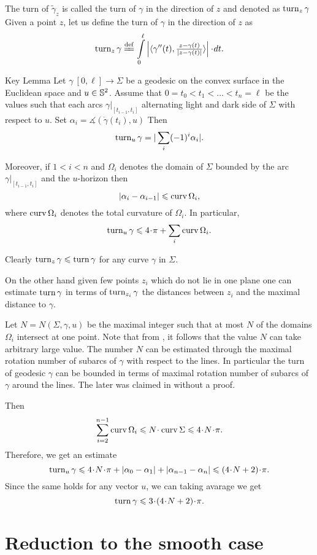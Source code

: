 \documentclass[a4paper,10pt]{amsart}
\begin{document}
The turn of $\tilde\gamma_z$ is called the turn of $\gamma$ in the direction of $z$ and denoted as $\mathop{\rm turn}\nolimits_z\gamma$
Given a point $z$, let us define the turn of $\gamma$ in the direction of $z$ as
\[\turn_z\gamma
\df
\int\limits_0^\ell
\left|
\langle\gamma''(t),\tfrac{z-\gamma(t)}{|z-\gamma(t)|}\rangle
\right|
\cdot dt.\]

\begin{thm}{Key Lemma}
\label{lem:key}
Let $\gamma\:[0,\ell]\to \Sigma$ be a geodesic on the convex surface in the Euclidean space 
and $u\in\mathbb{S}^2$.
Assume that $0=t_0<t_1<\dots<t_n=\ell$ be the values such that each arcs $\gamma|_{[t_{i-1},t_i]}$ alternating light and dark side of $\Sigma$ with respect to $u$.
Set $\alpha_i=\measuredangle(\dot\gamma(t_i),u)$
Then 
\[\mathop{\rm turn}\nolimits_u\gamma=|\sum_i(-1)^i\alpha_i|.\]

Moreover, if $1<i<n$ 
and $\Omega_i$ denotes the domain of $\Sigma$ bounded by the arc $\gamma|_{[t_{i-1},t_i]}$ and the $u$-horizon then 
\[|\alpha_i-\alpha_{i-1}|\leqslant \mathop{\rm curv}\nolimits\Omega_i,\]
where $\mathop{\rm curv}\nolimits\Omega_i$ denotes the total curvature of $\Omega_i$.
In particular,
\[\turn_u\gamma\le 4\cdot\pi+\sum_i\curv\Omega_i.\]
\end{thm}

Clearly $\mathop{\rm turn}\nolimits_z\gamma\leqslant \mathop{\rm turn}\nolimits \gamma$ for any curve $\gamma$ in $\Sigma$.

On the other hand given few points $z_i$ which do not lie in one plane
one can estimate $\mathop{\rm turn}\nolimits\gamma$ 
in terms of $\mathop{\rm turn}\nolimits_{z_i}\gamma$ 
the distances between $z_i$ and the maximal distance to $\gamma$.

Let $N=N(\Sigma,\gamma, u)$ be the maximal integer such that at most $N$ of the domains $\Omega_i$ intersect at one point.
Note that from \cite{BKZ}, it follows that the value $N$ can take arbitrary large value.
The number $N$ can be estimated through the maximal rotation number of subarcs of $\gamma$ with respect to the lines.
In particular the turn of geodesic $\gamma$ can be bounded in terms of maximal rotation number of subarcs of $\gamma$ around the lines.
The later was claimed in \cite{BKZ} without a proof.

Then
\[\sum_{i=2}^{n-1}\curv\Omega_i
\le 
N\cdot\curv\Sigma
\le 
4\cdot N\cdot\pi.\]
Therefore, we get an estimate
\[\turn_u\gamma
\le 
4\cdot N\cdot\pi+|\alpha_0-\alpha_1|+|\alpha_{n-1}-\alpha_n|
\le
(4\cdot N+2)\cdot\pi.\]
Since the same holds for any vector $u$,
we can taking avarage we get
\[\turn\gamma\le 3\cdot(4\cdot N+2)\cdot\pi.\]


\section{Reduction to the smooth case}
\end{document}
